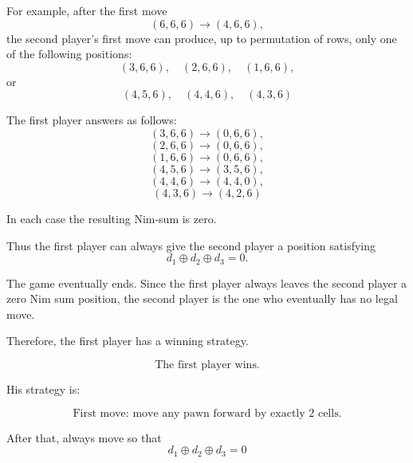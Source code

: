 For example, after the first move
\[
(6,6,6)\to(4,6,6),
\]
the second player's first move can produce, up to permutation of rows, only one of the following positions:
\[
(3,6,6),\quad (2,6,6),\quad (1,6,6),
\]
or
\[
(4,5,6),\quad (4,4,6),\quad (4,3,6)
\]

The first player answers as follows:
\[
(3,6,6)\to(0,6,6),
\]
\[
(2,6,6)\to(0,6,6),
\]
\[
(1,6,6)\to(0,6,6),
\]
\[
(4,5,6)\to(3,5,6),
\]
\[
(4,4,6)\to(4,4,0),
\]
\[
(4,3,6)\to(4,2,6)
\]

In each case the resulting Nim-sum is zero.

Thus the first player can always give the second player a position satisfying
\[
d_1\oplus d_2\oplus d_3=0.
\]

The game eventually ends.
Since the first player always leaves the second player a zero Nim sum position, the second player is the one who eventually has no legal move.

\smallbreak
Therefore, the first player has a winning strategy.

\[
\text{The first player wins.}
\]

His strategy is:

\[
\text{First move: move any pawn forward by exactly }2\text{ cells.}
\]

After that, always move so that
\[
d_1\oplus d_2\oplus d_3=0
\]
